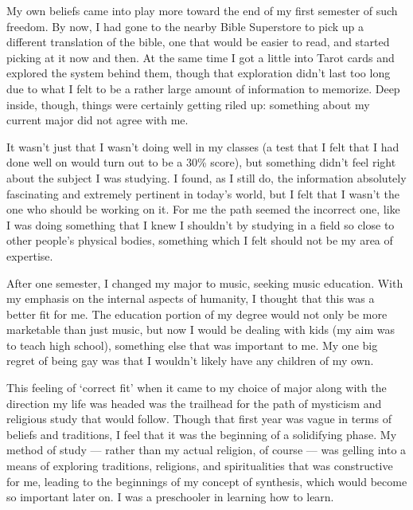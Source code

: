 My own beliefs came into play more toward the end of my first semester of such freedom. By now, I had gone to the nearby Bible Superstore to pick up a different translation of the bible, one that would be easier to read, and started picking at it now and then. At the same time I got a little into Tarot cards and explored the system behind them, though that exploration didn't last too long due to what I felt to be a rather large amount of information to memorize. Deep inside, though, things were certainly getting riled up: something about my current major did not agree with me.

It wasn't just that I wasn't doing well in my classes (a test that I felt that I had done well on would turn out to be a 30\% score), but something didn't feel right about the subject I was studying. I found, as I still do, the information absolutely fascinating and extremely pertinent in today's world, but I felt that I wasn't the one who should be working on it. For me the path seemed the incorrect one, like I was doing something that I knew I shouldn't by studying in a field so close to other people's physical bodies, something which I felt should not be my area of expertise.

After one semester, I changed my major to music, seeking music education. With my emphasis on the internal aspects of humanity, I thought that this was a better fit for me. The education portion of my degree would not only be more marketable than just music, but now I would be dealing with kids (my aim was to teach high school), something else that was important to me. My one big regret of being gay was that I wouldn't likely have any children of my own.

This feeling of `correct fit' when it came to my choice of major along with the direction my life was headed was the trailhead for the path of mysticism and religious study that would follow. Though that first year was vague in terms of beliefs and traditions, I feel that it was the beginning of a solidifying phase. My method of study --- rather than my actual religion, of course --- was gelling into a means of exploring traditions, religions, and spiritualities that was constructive for me, leading to the beginnings of my concept of synthesis, which would become so important later on. I was a preschooler in learning how to learn.
